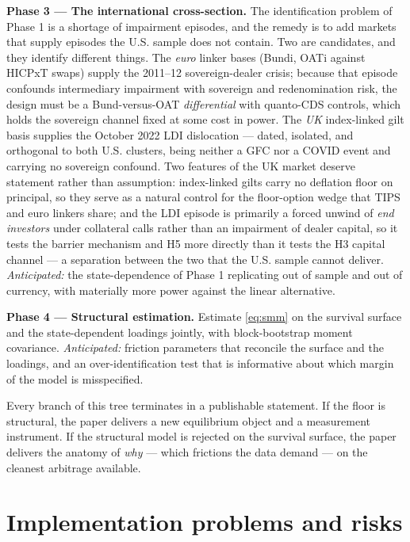 \documentclass[11pt]{article}
\begin{document}
\textbf{Phase 3 --- The international cross-section.} The identification problem of Phase 1 is a shortage of impairment episodes, and the remedy is to add markets that supply episodes the U.S. sample does not contain. Two are candidates, and they identify different things. The \emph{euro} linker bases (Bund\texteuro i, OAT\texteuro i against HICPxT swaps) supply the 2011--12 sovereign-dealer crisis; because that episode confounds intermediary impairment with sovereign and redenomination risk, the design must be a Bund-versus-OAT \emph{differential} with quanto-CDS controls, which holds the sovereign channel fixed at some cost in power. The \emph{UK} index-linked gilt basis supplies the October 2022 LDI dislocation --- dated, isolated, and orthogonal to both U.S. clusters, being neither a GFC nor a COVID event and carrying no sovereign confound. Two features of the UK market deserve statement rather than assumption: index-linked gilts carry no deflation floor on principal, so they serve as a natural control for the floor-option wedge that TIPS and euro linkers share; and the LDI episode is primarily a forced unwind of \emph{end investors} under collateral calls rather than an impairment of dealer capital, so it tests the barrier mechanism and H5 more directly than it tests the H3 capital channel --- a separation between the two that the U.S. sample cannot deliver. \emph{Anticipated:} the state-dependence of Phase 1 replicating out of sample and out of currency, with materially more power against the linear alternative.

\textbf{Phase 4 --- Structural estimation.} Estimate \eqref{eq:smm} on the survival surface and the state-dependent loadings jointly, with block-bootstrap moment covariance. \emph{Anticipated:} friction parameters that reconcile the surface and the loadings, and an over-identification test that is informative about which margin of the model is misspecified.

Every branch of this tree terminates in a publishable statement. If the floor is structural, the paper delivers a new equilibrium object and a measurement instrument. If the structural model is rejected on the survival surface, the paper delivers the anatomy of \emph{why} --- which frictions the data demand --- on the cleanest arbitrage available.

\section{Implementation problems and risks}
\end{document}
